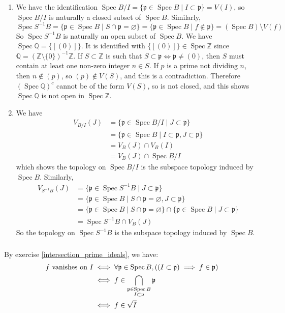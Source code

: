 \documentclass{article}
\newcommand{\Z}{\mathbb{Z}}
\newcommand{\Q}{\mathbb{Q}}
\DeclareMathOperator{\Spec}{Spec}
\newcommand{\p}{\mathfrak{p}}
\newcommand{\exercise}{\subsubsection} %
\begin{document}
\exercise{} \begin{enumerate}
    \item We have the identification $\Spec B/I = \{\p \in \Spec B \mid I \subset \p \} = V(I)$, so $\Spec B/I$ is naturally a closed subset of $\Spec B$. Similarly,
    \[\Spec S^{-1}B = \{\p \in \Spec B \mid S \cap \p = \varnothing \} = \{\p \in \Spec B \mid f \notin \p\} = (\Spec B) \setminus V(f)\]
    So $\Spec S^{-1}B$ is naturally an open subset of $\Spec B$. We have $\Spec \Q = \{[(0)]\}$. It is identified with $\{[(0)]\} \in \Spec \Z$ since $\Q = (\Z \setminus \{0\})^{-1} \Z$. If $S \subset \Z$ is such that $S \subset \p \iff \p \ne (0)$, then $S$ must contain at least one non-zero integer $n \in S$. If $p$ is a prime not dividing $n$, then $n \notin (p)$, so $(p) \notin V(S)$, and this is a contradiction. Therefore $(\Spec \Q)^c$ cannot be of the form $V(S)$, so is not closed, and this shows $\Spec \Q$ is not open in $\Spec \Z$.
    \item We have
    \begin{align*}
        V_{B/I}(J) & = \{\p \in \Spec B/I \mid J \subset \p\} \\
        & = \{\p \in \Spec B \mid I \subset \p, J \subset \p\} \\
        & = V_B (J) \cap V_B(I) \\
        & = V_B(J) \cap \Spec B/I
    \end{align*}
    which shows the topology on $\Spec B/I$ is the subspace topology induced by $\Spec B$. Similarly,
    \begin{align*}
        V_{S^{-1}B}(J) & = \{\p \in \Spec S^{-1}B \mid J \subset \p\} \\
        & = \{\p \in \Spec B \mid S\cap \p = \varnothing, J \subset \p\} \\
        & = \{\p \in \Spec B \mid S\cap \p = \varnothing\} \cap \{\p \in \Spec B \mid  J \subset \p\}\\ 
        & = \Spec S^{-1}B \cap V_B (J) 
    \end{align*}
    So the topology on $\Spec S^{-1}B$ is the subspace topology induced by $\Spec B$.
\end{enumerate}

\exercise{} \label{vanishing_on_ideal} By exercise \ref{intersection_prime_ideals}, we have:
\begin{align*}
    f \text{ vanishes on } I & \iff \forall \p \in \Spec B, ((I \subset \p) \implies f \in \p) \\
    & \iff f \in \bigcap_{\begin{subarray}{c} \p \in \Spec B \\ I \subset \p \end{subarray} } \p \\
    & \iff f \in \sqrt{I}
\end{align*}
\end{document}
